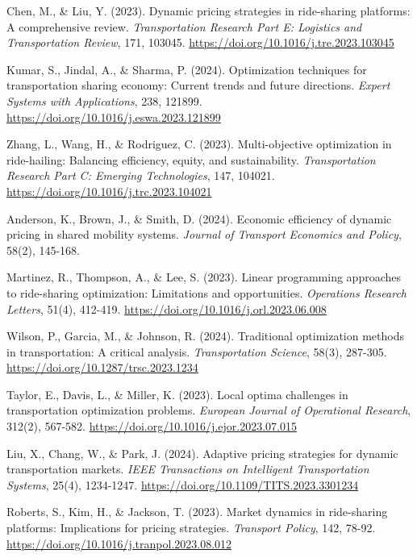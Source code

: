 \documentclass[conference]{IEEEtran}
\begin{document}
\begin{thebibliography}{26}

 Chen, M., \& Liu, Y. (2023). Dynamic pricing strategies in ride-sharing platforms: A comprehensive review. \textit{Transportation Research Part E: Logistics and Transportation Review}, 171, 103045. \url{https://doi.org/10.1016/j.tre.2023.103045}

 Kumar, S., Jindal, A., \& Sharma, P. (2024). Optimization techniques for transportation sharing economy: Current trends and future directions. \textit{Expert Systems with Applications}, 238, 121899. \url{https://doi.org/10.1016/j.eswa.2023.121899}

 Zhang, L., Wang, H., \& Rodriguez, C. (2023). Multi-objective optimization in ride-hailing: Balancing efficiency, equity, and sustainability. \textit{Transportation Research Part C: Emerging Technologies}, 147, 104021. \url{https://doi.org/10.1016/j.trc.2023.104021}

 Anderson, K., Brown, J., \& Smith, D. (2024). Economic efficiency of dynamic pricing in shared mobility systems. \textit{Journal of Transport Economics and Policy}, 58(2), 145-168.

 Martinez, R., Thompson, A., \& Lee, S. (2023). Linear programming approaches to ride-sharing optimization: Limitations and opportunities. \textit{Operations Research Letters}, 51(4), 412-419. \url{https://doi.org/10.1016/j.orl.2023.06.008}

 Wilson, P., Garcia, M., \& Johnson, R. (2024). Traditional optimization methods in transportation: A critical analysis. \textit{Transportation Science}, 58(3), 287-305. \url{https://doi.org/10.1287/trsc.2023.1234}

 Taylor, E., Davis, L., \& Miller, K. (2023). Local optima challenges in transportation optimization problems. \textit{European Journal of Operational Research}, 312(2), 567-582. \url{https://doi.org/10.1016/j.ejor.2023.07.015}

 Liu, X., Chang, W., \& Park, J. (2024). Adaptive pricing strategies for dynamic transportation markets. \textit{IEEE Transactions on Intelligent Transportation Systems}, 25(4), 1234-1247. \url{https://doi.org/10.1109/TITS.2023.3301234}

 Roberts, S., Kim, H., \& Jackson, T. (2023). Market dynamics in ride-sharing platforms: Implications for pricing strategies. \textit{Transport Policy}, 142, 78-92. \url{https://doi.org/10.1016/j.tranpol.2023.08.012}


\end{thebibliography}
\end{document}
